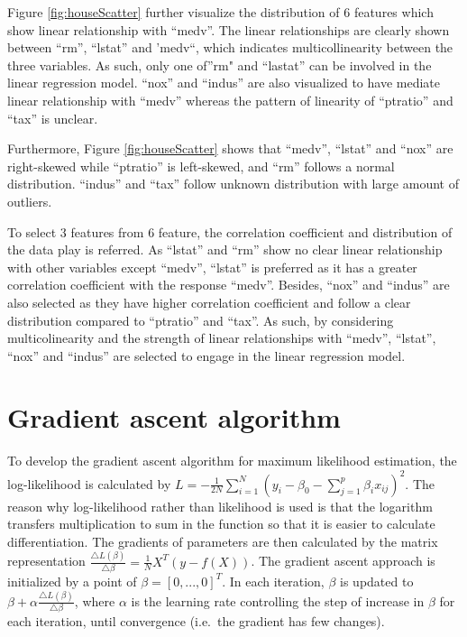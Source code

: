 \documentclass[letterpaper,12pt,twoside,]{pinp}
\begin{document}
Figure \ref{fig:houseScatter} further visualize the distribution of 6
features which show linear relationship with ``medv''. The linear
relationships are clearly shown between ``rm'', ``lstat'' and 'medv``,
which indicates multicollinearity between the three variables. As such,
only one of''rm" and ``lastat'' can be involved in the linear regression
model. ``nox'' and ``indus'' are also visualized to have mediate linear
relationship with ``medv'' whereas the pattern of linearity of
``ptratio'' and ``tax'' is unclear.

Furthermore, Figure \ref{fig:houseScatter} shows that ``medv'',
``lstat'' and ``nox'' are right-skewed while ``ptratio'' is left-skewed,
and ``rm'' follows a normal distribution. ``indus'' and ``tax'' follow
unknown distribution with large amount of outliers.

To select 3 features from 6 feature, the correlation coefficient and
distribution of the data play is referred. As ``lstat'' and ``rm'' show
no clear linear relationship with other variables except ``medv'',
``lstat'' is preferred as it has a greater correlation coefficient with
the response ``medv''. Besides, ``nox'' and ``indus'' are also selected
as they have higher correlation coefficient and follow a clear
distribution compared to ``ptratio'' and ``tax''. As such, by
considering multicolinearity and the strength of linear relationships
with ``medv'', ``lstat'', ``nox'' and ``indus'' are selected to engage
in the linear regression model.

\hypertarget{gradient-ascent-algorithm}{%
\section{Gradient ascent algorithm}\label{gradient-ascent-algorithm}}

To develop the gradient ascent algorithm for maximum likelihood
estimation, the log-likelihood is calculated by
\(L=-\frac{1}{2N}\sum^N_{i=1}(y_i-\beta_0-\sum^p_{j=1}\beta_ix_{ij})^2\).
The reason why log-likelihood rather than likelihood is used is that the
logarithm transfers multiplication to sum in the function so that it is
easier to calculate differentiation. The gradients of parameters are
then calculated by the matrix representation
\(\frac{\bigtriangleup L(\beta)}{\bigtriangleup \beta}=\frac{1}{N}X^T(y-f(X))\).
The gradient ascent approach is initialized by a point of
\(\beta=[0,...,0]^T\). In each iteration, \(\beta\) is updated to
\(\beta+\alpha\frac{\bigtriangleup L(\beta)}{\bigtriangleup \beta}\),
where \(\alpha\) is the learning rate controlling the step of increase
in \(\beta\) for each iteration, until convergence (i.e.~the gradient
has few changes).
\end{document}
